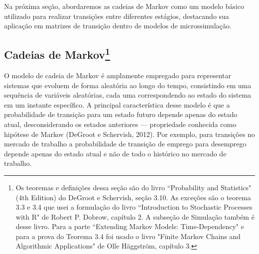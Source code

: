 \documentclass[12pt]{article}
\theoremstyle{break}
\begin{document}
Na próxima seção, abordaremos as cadeias de Markov como um modelo básico utilizado para realizar transições entre diferentes estágios, destacando sua aplicação em matrizes de transição dentro de modelos de microssimulação.














\subsection{Cadeias de Markov\footnote{Os teoremas e definições dessa seção são do livro ``Probability and Statistics" (4th Edition) do DeGroot e Schervish, seção 3.10. As exceções são o teorema 3.3 e 3.4 que usei a formulação do livro ``Introduction to Stochastic Processes with R" de Robert P. Dobrow, capítulo 2. A subseção de Simulação também é desse livro. Para a parte ``Extending Markov Models: Time-Dependency" e para a prova do Teorema 3.4 foi usado o livro "Finite Markov Chains and Algorithmic Applications" de Olle Häggström, capítulo 3.}}



O modelo de cadeia de Markov é amplamente empregado para representar sistemas que evoluem de forma aleatória ao longo do tempo, consistindo em uma sequência de variáveis aleatórias, cada uma correspondendo ao estado do sistema em um instante específico. A principal característica desse modelo é que a probabilidade de transição para um estado futuro depende apenas do estado atual, desconsiderando os estados anteriores — propriedade conhecida como hipótese de Markov (DeGroot e Schervish, 2012). Por exemplo, para transições no mercado de trabalho a probabilidade de transição de emprego para desemprego depende apenas do estado atual e não de todo o histórico no mercado de trabalho.
\end{document}

